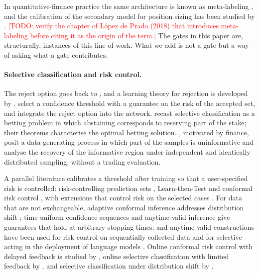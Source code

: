 \documentclass[11pt]{article}
\theoremstyle{remark}
\newcommand{\todo}[1]{\textcolor{red}{[TODO: #1]}}
\begin{document}
In quantitative-finance practice the same architecture is known as meta-labeling
\citep{joubert2022metalabeling}, and the calibration of the secondary model for position sizing
has been studied by \citet{meyer2023metalabeling}.
\todo{verify the chapter of L\'opez de Prado (2018) that introduces meta-labeling before citing
it as the origin of the term.}
The gates in this paper are, structurally, instances of this line of work. What we add is not a
gate but a way of asking what a gate contributes.

\paragraph{Selective classification and risk control.}
The reject option goes back to \citet{chow1970optimum}, and a learning theory for rejection is
developed by \citet{cortes2016learning}. \citet{geifman2017selective} select a confidence
threshold with a guarantee on the risk of the accepted set, and \citet{geifman2019selectivenet}
integrate the reject option into the network. \citet{ziyin2019deepgamblers} recast selective
classification as a betting problem in which abstaining corresponds to reserving part of the
stake; their theorems characterise the optimal betting solution. \citet{zhang2023abstain},
motivated by finance, posit a data-generating process in which part of the samples is
uninformative and analyse the recovery of the informative region under independent and
identically distributed sampling, without a trading evaluation.

A parallel literature calibrates a threshold after training so that a user-specified risk is
controlled: risk-controlling prediction sets \citep{bates2021rcps}, Learn-then-Test
\citep{angelopoulos2021ltt} and conformal risk control \citep{angelopoulos2022crc}, with
extensions that control risk on the selected cases \citep{xu2025scrc,bai2026score}. For data that
are not exchangeable, adaptive conformal inference addresses distribution shift
\citep{gibbs2021aci}; time-uniform confidence sequences \citep{howard2021timeuniform} and
anytime-valid inference \citep{ramdas2023savi} give guarantees that hold at arbitrary stopping
times; and anytime-valid constructions have been used for risk control on sequentially collected
data \citep{xu2024arcps,hultberg2026anytime} and for selective acting in the deployment of
language models \citep{khosravi2026csa}. Online conformal risk control with delayed feedback is
studied by \citet{wang2026caocrc}, online selective classification with limited feedback by
\citet{gangrade2021online}, and selective classification under distribution shift by
\citet{liang2024selective}.
\end{document}
